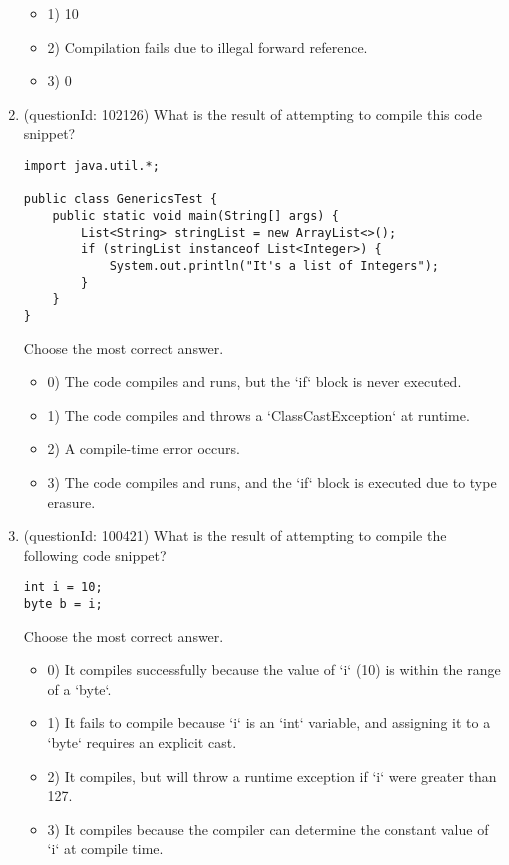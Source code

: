 \documentclass[12pt]{article}
\begin{document}
\begin{enumerate}[label=(\arabic*)]
\begin{itemize}
\item 1) 10

\item 2) Compilation fails due to illegal forward reference.

\item 3) 0

\end{itemize}
\item (questionId: 102126) What is the result of attempting to compile this code snippet?\n\begin{verbatim}
import java.util.*;

public class GenericsTest {
    public static void main(String[] args) {
        List<String> stringList = new ArrayList<>();
        if (stringList instanceof List<Integer>) {
            System.out.println("It's a list of Integers");
        }
    }
}
\end{verbatim}
Choose the most correct answer. 
\begin{itemize}
\item 0) The code compiles and runs, but the `if` block is never executed.

\item 1) The code compiles and throws a `ClassCastException` at runtime.

\item 2) A compile-time error occurs.

\item 3) The code compiles and runs, and the `if` block is executed due to type erasure.

\end{itemize}
\item (questionId: 100421) What is the result of attempting to compile the following code snippet?
\begin{verbatim}
int i = 10;
byte b = i;
\end{verbatim}
Choose the most correct answer. 
\begin{itemize}
\item 0) It compiles successfully because the value of `i` (10) is within the range of a `byte`.

\item 1) It fails to compile because `i` is an `int` variable, and assigning it to a `byte` requires an explicit cast.

\item 2) It compiles, but will throw a runtime exception if `i` were greater than 127.

\item 3) It compiles because the compiler can determine the constant value of `i` at compile time.


\end{itemize}
\end{enumerate}
\end{document}
